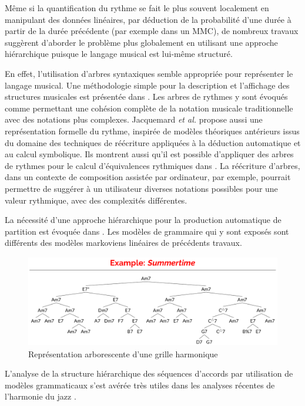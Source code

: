 Même si la quantification du rythme se fait le plus souvent localement en
manipulant des données linéaires, par déduction de la probabilité d'une durée à
partir de la durée précédente (par exemple dans un MMC), de nombreux travaux
suggèrent d’aborder le problème plus globalement en utilisant une approche
hiérarchique puisque le langage musical est lui-même structuré.

En effet, l’utilisation d’arbres syntaxiques semble appropriée pour représenter
le langage musical. Une méthodologie simple pour la description et l'affichage
des structures musicales est présentée dans \cite{rythm_tree}. Les arbres de
rythmes y sont évoqués comme permettant une cohésion complète de la notation
musicale traditionnelle avec des notations plus complexes. Jacquemard
\textit{et al.} \cite{jacquemard_1} propose aussi une représentation
formelle du rythme, inspirée de modèles théoriques antérieurs issus du domaine
des techniques de réécriture appliquées à la déduction automatique et au calcul
symbolique. Ils montrent aussi qu'il est possible d'appliquer des arbres de
rythmes pour le calcul d'équivalences rythmiques dans
\cite{jacquemard_2}. La réécriture d’arbres, dans un contexte de
composition assistée par ordinateur, par exemple, pourrait permettre de
suggérer à un utilisateur diverses notations possibles pour une valeur
rythmique, avec des complexités différentes.

La nécessité d’une approche hiérarchique pour la production automatique de
partition est évoquée dans \cite{foscarin}. 
Les modèles de grammaire qui y sont exposés sont différents des modèles
markoviens linéaires de précédents travaux.\\
\begin{figure}[h]
	\centering
	\includegraphics[height=40mm, width=120mm]{
    z_images/2_etat_de_l_art/1_summertime_tree.png}
    \caption{Représentation arborescente d’une grille harmonique
    \protect\cite{harasimjazz}}
    \label{arbre_harmo}
\end{figure}

L’analyse de la structure hiérarchique des séquences d’accords par utilisation
de modèles grammaticaux s’est avérée très utiles dans les analyses récentes de
l’harmonie du jazz \cite{harasimjazz}. 

